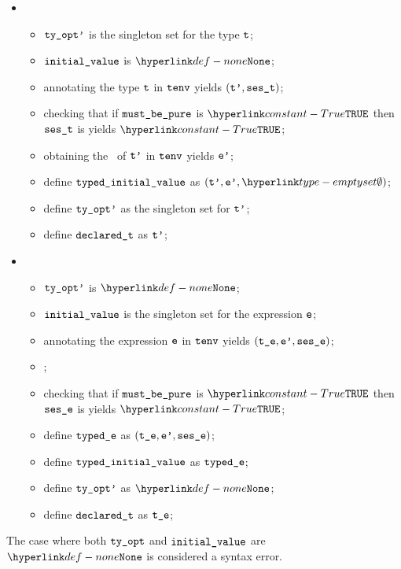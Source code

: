 \begin{itemize}
  \item {}
  \begin{itemize}
    \item $\texttt{ty\_opt'}$ is the singleton set for the type $\texttt{t}$;
    \item $\texttt{initial\_value}$ is $\None$;
    \item annotating the type $\texttt{t}$ in $\texttt{tenv}$ yields $(\texttt{t'}, \texttt{ses\_t})$\ProseOrTypeError;
    \item checking that if $\texttt{must\_be\_pure}$ is $\True$ then $\texttt{ses\_t}$ is \pureterm{} yields $\True$\ProseOrTypeError;
    \item obtaining the \basevalueterm\ of $\texttt{t'}$ in $\texttt{tenv}$ yields $\texttt{e'}$\ProseOrTypeError;
    \item define $\texttt{typed\_initial\_value}$ as $(\vtp, \vep, \emptyset)$;
    \item define $\texttt{ty\_opt'}$ as the singleton set for $\texttt{t'}$;
    \item define $\texttt{declared\_t}$ as $\texttt{t'}$;
  \end{itemize}

  \item {}
  \begin{itemize}
    \item $\texttt{ty\_opt'}$ is $\None$;
    \item $\texttt{initial\_value}$ is the singleton set for the expression $\texttt{e}$;
    \item annotating the expression $\texttt{e}$ in $\texttt{tenv}$ yields $(\texttt{t\_e}, \texttt{e'}, \texttt{ses\_e})$\ProseOrTypeError;
    \item \Prosenoprecisionloss{$\vte$};
    \item checking that if $\texttt{must\_be\_pure}$ is $\True$ then $\texttt{ses\_e}$ is \pureterm{} yields $\True$\ProseOrTypeError;
    \item define $\texttt{typed\_e}$ as $(\texttt{t\_e}, \texttt{e'}, \texttt{ses\_e})$;
    \item define $\texttt{typed\_initial\_value}$ as $\texttt{typed\_e}$;
    \item define $\texttt{ty\_opt'}$ as $\None$;
    \item define $\texttt{declared\_t}$ as $\vte$;
  \end{itemize}
\end{itemize}
The case where both $\texttt{ty\_opt}$ and $\texttt{initial\_value}$ are $\None$ is considered a syntax error.

